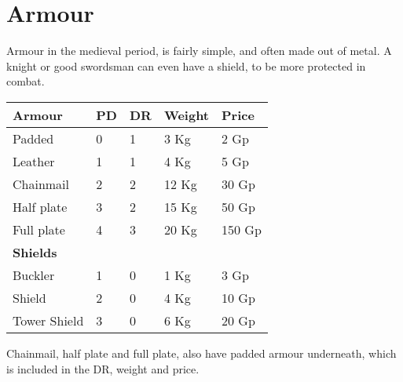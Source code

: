 \chapter{Armour}
Armour in the medieval period, is fairly simple, and often made out of metal. A knight or good swordsman can even have a shield, to be more protected in combat.\\
\begin{center}
\begin{tabular}{|l|l|l|l|l|}\hline
\rowcolor{gray!50}
    \textbf{Armour} &\textbf{PD}&\textbf{DR}&\textbf{Weight}&\textbf{Price} \\ \hline
    Padded          & 0  & 1 & 3 Kg & 2 Gp  \\
    Leather         & 1  & 1 & 4 Kg & 5 Gp  \\
    Chainmail       & 2  & 2 & 12 Kg& 30 Gp \\
    Half plate      & 3  & 2 & 15 Kg& 50 Gp \\
    Full plate      & 4  & 3 & 20 Kg& 150 Gp\\ \hline
 \textbf{Shields} \\\hline
    Buckler         & 1 & 0  & 1 Kg & 3 Gp\\
    Shield          & 2 & 0  & 4 Kg & 10 Gp\\
    Tower Shield    & 3 & 0  & 6 Kg & 20 Gp\\
    \hline
\end{tabular}
\end{center}

Chainmail, half plate and full plate, also have padded armour underneath, which is included in the DR, weight and price.
